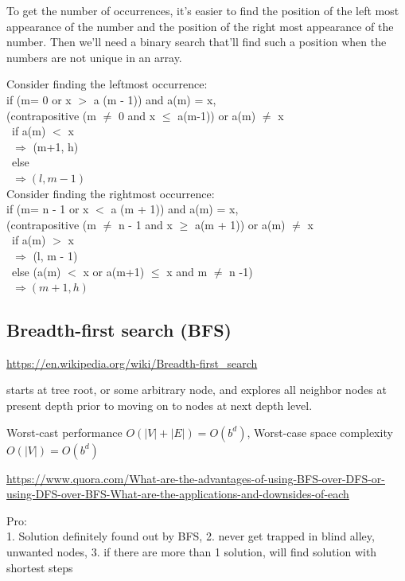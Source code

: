 \documentclass[10pt]{amsart}
\begin{document}
\begin{multicols*}{2}
To get the number of occurrences, it's easier to find the position of the left most appearance of the number and the position of the right most appearance of the number. Then we'll need a binary search that'll find such a position when the numbers are not unique in an array.

Consider finding the leftmost occurrence: \\
if (m= 0 or x $>$ a (m - 1)) and a(m) = x, \\
(contrapositive (m $\neq$ 0 and x $\leq $ a(m-1)) or a(m) $\neq$ x \\
\quad \, if a(m) $<$ x \\
\quad \, $\Longrightarrow $ (m+1, h) \\
\quad \, else \\
\quad \, $\Longrightarrow (l, m - 1)$ \\

Consider finding the rightmost occurrence: \\
if (m= n - 1 or x $<$ a (m + 1)) and a(m) = x, \\
(contrapositive (m $\neq$ n - 1 and x $\geq $ a(m  + 1)) or a(m) $\neq$ x \\
\quad \, if a(m) $>$ x \\
\quad \, $\Longrightarrow $ (l, m - 1) \\
\quad \, else (a(m) $<$ x or a(m+1) $\leq $ x and m $\neq $ n -1) \\
\quad \, $\Longrightarrow (m + 1, h)$ \\


\subsection{Breadth-first search (BFS)}

\url{https://en.wikipedia.org/wiki/Breadth-first_search}

starts at tree root, or some arbitrary node, and explores all neighbor nodes at present depth prior to moving on to nodes at next depth level.

Worst-cast performance $O(|V|+|E|) = O(b^d)$, Worst-case space complexity $O(|V|) = O(b^d)$

\url{https://www.quora.com/What-are-the-advantages-of-using-BFS-over-DFS-or-using-DFS-over-BFS-What-are-the-applications-and-downsides-of-each}

Pro: \\
1. Solution definitely found out by BFS, 2. never get trapped in blind alley, unwanted nodes, 3. if there are more than 1 solution, will find solution with shortest steps


\end{multicols*}
\end{document}
